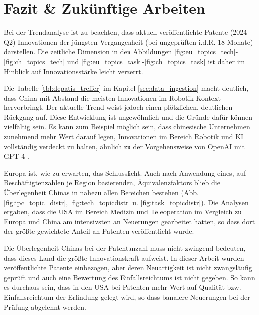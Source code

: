\newpage

\section{Fazit \& Zukünftige Arbeiten}
Bei der Trendanalyse ist zu beachten, dass aktuell veröffentlichte Patente (2024-Q2) Innovationen der jüngsten Vergangenheit (bei ungeprüften i.d.R. 18 Monate) darstellen. Die zeitliche Dimension in den Abbildungen \ref{fig:eu_topics_tech}-\ref{fig:ch_topics_tech} und \ref{fig:eu_topics_task}-\ref{fig:ch_topics_task} ist daher im Hinblick auf Innovationsstärke leicht verzerrt.

Die Tabelle \ref{tbl:depatis_treffer} im Kapitel \ref{sec:data_ingestion} macht deutlich, dass China mit Abstand die meisten Innovationen im Robotik-Kontext hervorbringt. Der aktuelle Trend weist jedoch einen plötzlichen, deutlichen Rückgang auf. Diese Entwicklung ist ungewöhnlich und die Gründe dafür können vielfältig sein. Es kann zum Beispiel möglich sein, dass chinesische Unternehmen zunehmend mehr Wert darauf legen, Innovationen im Bereich Robotik und KI vollständig verdeckt zu halten, ähnlich zu der Vorgehensweise von OpenAI mit GPT-4 \autocite{vincent2023openai}.

Europa ist, wie zu erwarten, das Schlusslicht. Auch nach Anwendung eines, auf Beschäftigtenzahlen je Region basierenden, Äquivalenzfaktors blieb die Überlegenheit Chinas in nahezu allen Bereichen bestehen (Abb. \ref{fig:ipc_topic_distr}, \ref{fig:tech_topicdistr} u. \ref{fig:task_topicdistr}). 
Die Analysen ergaben, dass die USA im Bereich Medizin und Teleoperation im Vergleich zu Europa und China am intensivsten an Neuerungen gearbeitet hatten, so dass dort der größte gewichtete Anteil an Patenten veröffentlicht wurde.

Die Überlegenheit Chinas bei der Patentanzahl muss nicht zwingend bedeuten, dass dieses Land die größte Innovationskraft aufweist. In dieser Arbeit wurden veröffentlichte Patente einbezogen, aber deren Neuartigkeit ist nicht zwangsläufig geprüft und auch eine Bewertung des Einfallsreichtums ist nicht gegeben. So kann es durchaus sein, dass in den USA bei Patenten mehr Wert auf Qualität bzw. Einfallsreichtum der Erfindung gelegt wird, so dass banalere Neuerungen bei der Prüfung abgelehnt werden.